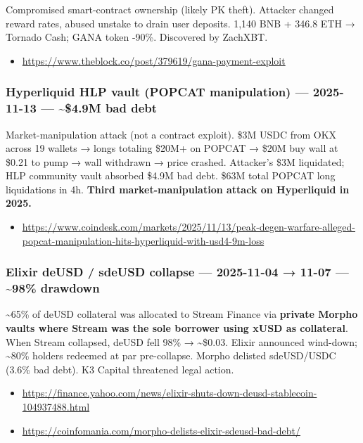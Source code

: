 Compromised smart-contract ownership (likely PK theft). Attacker changed reward rates, abused unstake to drain user deposits. 1,140 BNB + 346.8 ETH → Tornado Cash; GANA token -90\%. Discovered by ZachXBT.

\begin{itemize}
\tightlist
\item
  \url{https://www.theblock.co/post/379619/gana-payment-exploit}
\end{itemize}

\subsubsection{Hyperliquid HLP vault (POPCAT manipulation) --- 2025-11-13 --- \textasciitilde\$4.9M bad debt}\label{hyperliquid-hlp-vault-popcat-manipulation-2025-11-13-4.9m-bad-debt}

Market-manipulation attack (not a contract exploit). \$3M USDC from OKX across 19 wallets → longs totaling \$20M+ on POPCAT → \$20M buy wall at \$0.21 to pump → wall withdrawn → price crashed. Attacker's \$3M liquidated; HLP community vault absorbed \$4.9M bad debt. \$63M total POPCAT long liquidations in 4h. \textbf{Third market-manipulation attack on Hyperliquid in 2025.}

\begin{itemize}
\tightlist
\item
  \url{https://www.coindesk.com/markets/2025/11/13/peak-degen-warfare-alleged-popcat-manipulation-hits-hyperliquid-with-usd4-9m-loss}
\end{itemize}

\subsubsection{Elixir deUSD / sdeUSD collapse --- 2025-11-04 → 11-07 --- \textasciitilde98\% drawdown}\label{elixir-deusd-sdeusd-collapse-2025-11-04-11-07-98-drawdown}

\textasciitilde65\% of deUSD collateral was allocated to Stream Finance via \textbf{private Morpho vaults where Stream was the sole borrower using xUSD as collateral}. When Stream collapsed, deUSD fell 98\% → \textasciitilde\$0.03. Elixir announced wind-down; \textasciitilde80\% holders redeemed at par pre-collapse. Morpho delisted sdeUSD/USDC (3.6\% bad debt). K3 Capital threatened legal action.

\begin{itemize}
\tightlist
\item
  \url{https://finance.yahoo.com/news/elixir-shuts-down-deusd-stablecoin-104937488.html}
\item
  \url{https://coinfomania.com/morpho-delists-elixir-sdeusd-bad-debt/}
\end{itemize}

